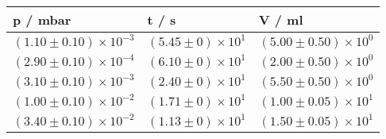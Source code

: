 \begin{tabular}{lll}
\toprule
                                    p / mbar &                                    t / s &                                      V / ml \\
\midrule
 $\left(1.10 \pm 0.10\right) \times 10^{-3}$ &  $\left(5.45 \pm 0\right) \times 10^{1}$ &  $\left(5.00 \pm 0.50\right) \times 10^{0}$ \\
 $\left(2.90 \pm 0.10\right) \times 10^{-4}$ &  $\left(6.10 \pm 0\right) \times 10^{1}$ &  $\left(2.00 \pm 0.50\right) \times 10^{0}$ \\
 $\left(3.10 \pm 0.10\right) \times 10^{-3}$ &  $\left(2.40 \pm 0\right) \times 10^{1}$ &  $\left(5.50 \pm 0.50\right) \times 10^{0}$ \\
 $\left(1.00 \pm 0.10\right) \times 10^{-2}$ &  $\left(1.71 \pm 0\right) \times 10^{1}$ &  $\left(1.00 \pm 0.05\right) \times 10^{1}$ \\
 $\left(3.40 \pm 0.10\right) \times 10^{-2}$ &  $\left(1.13 \pm 0\right) \times 10^{1}$ &  $\left(1.50 \pm 0.05\right) \times 10^{1}$ \\
\bottomrule
\end{tabular}

